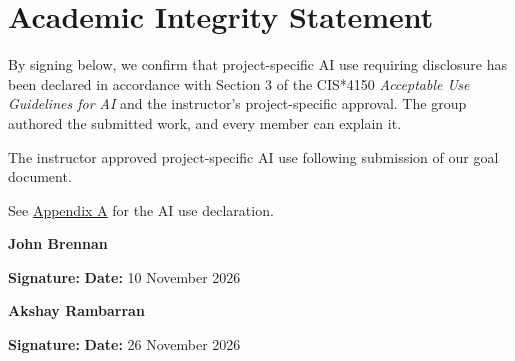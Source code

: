 \section*{Academic Integrity Statement}
\label{sec:academic-integrity}

\noindent
By signing below, we confirm that project-specific AI use requiring disclosure
has been declared in accordance with Section 3 of the CIS*4150
\textit{Acceptable Use Guidelines for AI} and the instructor's project-specific
approval. The group authored the submitted work, and every member can explain it.

\medskip
\noindent
The instructor approved project-specific AI use following submission of our
goal document.

\medskip
\noindent
See \hyperref[app:A]{Appendix A} for the AI use declaration.

\bigskip
\noindent
\textbf{John Brennan}
\par\medskip
\noindent
\textbf{Signature:} 
\hfill
\textbf{Date:} 10 November 2026

\bigskip
\noindent
\textbf{Akshay Rambarran}
\par\medskip
\noindent
\textbf{Signature:} 
\hfill
\textbf{Date:} 26 November 2026
